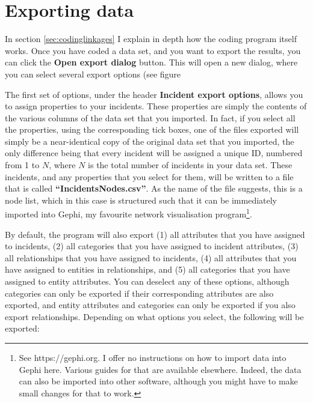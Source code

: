 \documentclass{memoir}
\begin{document}
\section{Exporting data}
\label{sec:exportingdata}

In section \ref{sec:codinglinkages} I explain in depth how the coding program itself works. Once you have coded a data set, and you want to export the results, you can click the \textbf{Open export dialog} button. This will open a new dialog, where you can select several export options (see figure %


The first set of options, under the header \textbf{Incident export options}, allows you to assign properties to your incidents. These properties are simply the contents of the various columns of the data set that you imported. In fact, if you select all the properties, using the corresponding tick boxes, one of the files exported will simply be a near-identical copy of the original data set that you imported, the only difference being that every incident will be assigned a unique ID, numbered from 1 to \(N\), where \(N\) is the total number of incidents in your data set. These incidents, and any properties that you select for them, will be written to a file that is called \textbf{``Incidents\textunderscore Nodes.csv''}. As the name of the file suggests, this is a node list, which in this case is structured such that it can be immediately imported into Gephi, my favourite network visualisation program\footnote{See https://gephi.org. I offer no instructions on how to import data into Gephi here. Various guides for that are available elsewhere. Indeed, the data can also be imported into other software, although you might have to make small changes for that to work.}. 

By default, the program will also export (1) all attributes that you have assigned to incidents, (2) all categories that you have assigned to incident attributes, (3) all relationships that you have assigned to incidents, (4) all attributes that you have assigned to entities in relationships, and (5) all categories that you have assigned to entity attributes. You can deselect any of these options, although categories can only be exported if their corresponding attributes are also exported, and entity attributes and categories can only be exported if you also export relationships. Depending on what options you select, the following will be exported:
\end{document}
